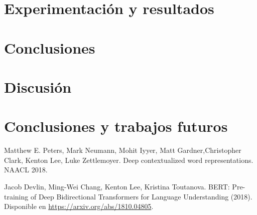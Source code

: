 \documentclass[conference]{IEEEtran}
\begin{document}
\section{Experimentaci\'on y resultados}


\section{Conclusiones}

\section{Discusi\'on}

\section{Conclusiones y trabajos futuros}

\begin{thebibliography}{00}
Matthew E. Peters, Mark Neumann, Mohit Iyyer, 
Matt Gardner,Christopher Clark, Kenton Lee, Luke Zettlemoyer. 
Deep contextualized word representations. NAACL 2018.

Jacob Devlin, Ming-Wei Chang, Kenton Lee, 
Kristina Toutanova. 
BERT: Pre-training of Deep Bidirectional Transformers for Language Understanding (2018). 
Disponible en \href{https://arxiv.org/abs/1810.04805}{https://arxiv.org/abs/1810.04805}.

\end{thebibliography}
\end{document}
